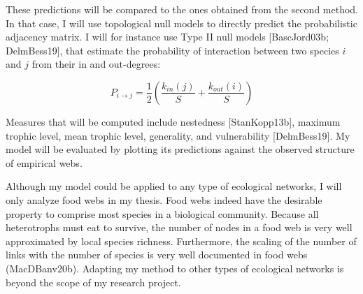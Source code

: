 These predictions will be compared to the ones obtained from the second method.
In that case, I will use topological null models to directly predict the
probabilistic adjacency matrix. I will for instance use Type II null models
[BascJord03b; DelmBess19], that estimate the probability of interaction
between two species $i$ and $j$ from their in and out-degrees:

$$P_{i \rightarrow j} =
\frac{1}{2}\left(\frac{k_{in}(j)}{S}+\frac{k_{out}(i)}{S}\right)
$$

Measures that will be
computed include nestedness [StanKopp13b], maximum trophic level, mean trophic
level, generality, and vulnerability [DelmBess19]. My model will be evaluated by plotting its predictions against the observed
structure of empirical webs.

Although my model could be applied to any type of ecological networks, I will
only analyze food webs in my thesis. Food webs indeed have the desirable
property to comprise most species in a biological community. Because all
heterotrophs must eat to survive, the number of nodes in a food web is very well
approximated by local species richness. Furthermore, the scaling of the number
of links with the number of species is very well documented in food webs
(MacDBanv20b). Adapting my method to other types of ecological networks is
beyond the scope of my research project.

\endinput
